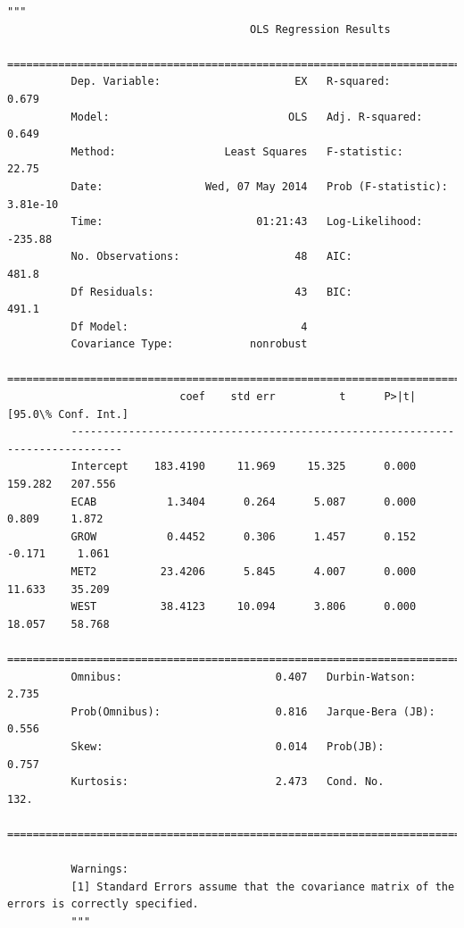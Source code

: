 \documentclass[10pt]{article}\usepackage[]{graphicx}\usepackage[]{xcolor}
\begin{document}
            \begin{Verbatim}[commandchars=\\\{\}]
          """
                                      OLS Regression Results                            
          ==============================================================================
          Dep. Variable:                     EX   R-squared:                       0.679
          Model:                            OLS   Adj. R-squared:                  0.649
          Method:                 Least Squares   F-statistic:                     22.75
          Date:                Wed, 07 May 2014   Prob (F-statistic):           3.81e-10
          Time:                        01:21:43   Log-Likelihood:                -235.88
          No. Observations:                  48   AIC:                             481.8
          Df Residuals:                      43   BIC:                             491.1
          Df Model:                           4                                         
          Covariance Type:            nonrobust                                         
          ==============================================================================
                           coef    std err          t      P>|t|      [95.0\% Conf. Int.]
          ------------------------------------------------------------------------------
          Intercept    183.4190     11.969     15.325      0.000       159.282   207.556
          ECAB           1.3404      0.264      5.087      0.000         0.809     1.872
          GROW           0.4452      0.306      1.457      0.152        -0.171     1.061
          MET2          23.4206      5.845      4.007      0.000        11.633    35.209
          WEST          38.4123     10.094      3.806      0.000        18.057    58.768
          ==============================================================================
          Omnibus:                        0.407   Durbin-Watson:                   2.735
          Prob(Omnibus):                  0.816   Jarque-Bera (JB):                0.556
          Skew:                           0.014   Prob(JB):                        0.757
          Kurtosis:                       2.473   Cond. No.                         132.
          ==============================================================================
          
          Warnings:
          [1] Standard Errors assume that the covariance matrix of the errors is correctly specified.
          """
\end{Verbatim}
        
\end{document}
